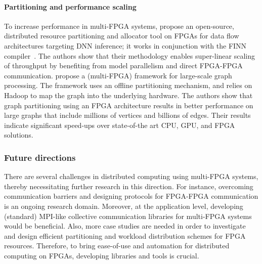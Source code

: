 \paragraph{Partitioning and performance scaling} %
To increase performance in multi-FPGA systems, \citet{Alonso2021Elastic-DF:Partitioning} %
propose an open-source, distributed resource partitioning and allocator tool on FPGAs for data flow architectures targeting DNN inference; it %
works in conjunction with the FINN compiler~\cite{umuroglu2017finn}. The authors show that %
their methodology enables super-linear scaling of throughput by benefiting from model parallelism and direct FPGA-FPGA communication. %
\citet{Sahebi2023DistributedFPGAs} %
propose a (multi-FPGA) framework for %
large-scale graph processing. The framework uses an offline partitioning mechanism, and relies on %
Hadoop to map the graph into the underlying hardware. The authors show that graph partitioning using an FPGA architecture results in better performance on large graphs that include millions of vertices and billions of edges. Their results indicate %
significant speed-ups over %
state-of-the art CPU, GPU, and FPGA solutions.


\subsubsection*{\bf{Future directions}}

There are several %
challenges in distributed computing using multi-FPGA systems, thereby %
necessitating %
further research in this direction. For instance, overcoming communication barriers and designing protocols for FPGA-FPGA communication is an ongoing research domain. Moreover, at the application level, developing (standard) MPI-like collective communication libraries for multi-FPGA systems would be beneficial. %
Also, %
more case studies are needed in order to investigate and design efficient partitioning and workload distribution schemes %
for FPGA resources. Therefore, to bring ease-of-use and automation for distributed computing on FPGAs, developing libraries and tools  is crucial. 


\iffalse
